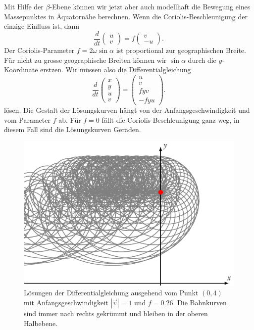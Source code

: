 Mit Hilfe der $\beta$-Ebene können wir jetzt aber auch modellhaft 
die Bewegung eines Massepunktes in Äquatornähe berechnen.
Wenn die Coriolis-Beschleunigung der einzige Einfluss ist, dann
\begin{equation}
\frac{d}{dt}
\begin{pmatrix}u\\v\end{pmatrix}
=
f\begin{pmatrix}v\\-u\end{pmatrix}.
\end{equation}
Der Coriolis-Parameter $f=2\omega\sin\alpha$ ist proportional
zur geographischen Breite.
Für nicht zu grosse geographische Breiten können wir $\sin\alpha$ durch
die $y$-Koordinate erstzen.
Wir müssen also die Differentialgleichung
\begin{equation}
\frac{d}{dt}
\begin{pmatrix}x\\y\\u\\v\end{pmatrix}
=
\begin{pmatrix}
u\\v\\fyv\\-fyu
\end{pmatrix}.
\label{skript:coriolis-dgl}
\end{equation}
lösen.
Die Gestalt der Lösungskurven hängt von der Anfangsgeschwindigkeit und
vom Parameter $f$ ab.
Für $f=0$ fällt die Coriolis-Beschleunigung ganz weg, in diesem
Fall sind die Lösungskurven Geraden.

\begin{figure}
\centering
\includegraphics{chapters/1/stream.pdf}
\caption{
Lösungen der Differentialgleichung ausgehend vom Punkt $(0,4)$
mit Anfangsgeschwindigkeit $|\vec{v}|=1$ und $f=0.26$.
Die Bahnkurven sind immer nach rechts gekrümmt und bleiben in der
oberen Halbebene.
\label{skript:stream-graph}}
\end{figure}


